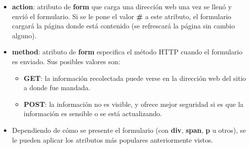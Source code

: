\begin{itemize}
    \item \textbf{action}: atributo de \textbf{form} que carga una dirección web una vez se llenó y envió el formulario. Si se le pone el valor \textbf{\#} a este atributo, el formulario cargará la página donde está contenido (se refrescará la página sin cambio alguno).
    \item \textbf{method}: atributo de \textbf{form} especifica el método HTTP cuando el formulario es enviado. Sus posibles valores son:
    \begin{itemize}
        \item \textbf{GET}: la información recolectada puede verse en la dirección web del sitio a donde fue mandada.
        \item \textbf{POST}: la información no es visible, y ofrece mejor seguridad si es que la información es sensible o se está actualizando.
    \end{itemize}
    \item Dependiendo de cómo se presente el formulario (con \textbf{div}, \textbf{span}, \textbf{p} u otros), se le pueden aplicar los atributos más populares anteriormente vistos.
\end{itemize}

